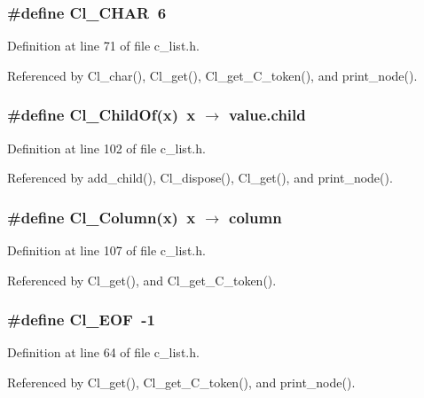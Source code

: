 \subsubsection{\setlength{\rightskip}{0pt plus 5cm}\#define Cl\_\-CHAR~6}\label{c__list_8h_038fd19f2434e08b103262df0fdebcd2}




Definition at line 71 of file c\_\-list.h.

Referenced by Cl\_\-char(), Cl\_\-get(), Cl\_\-get\_\-C\_\-token(), and print\_\-node().
\subsubsection{\setlength{\rightskip}{0pt plus 5cm}\#define Cl\_\-Child\-Of(x)~x $\rightarrow$ value.child}\label{c__list_8h_b9cbe7277c1f9ffaceaafea877fc41de}




Definition at line 102 of file c\_\-list.h.

Referenced by add\_\-child(), Cl\_\-dispose(), Cl\_\-get(), and print\_\-node().
\subsubsection{\setlength{\rightskip}{0pt plus 5cm}\#define Cl\_\-Column(x)~x $\rightarrow$ column}\label{c__list_8h_11d2d38eb19032f0c095052d1ea1aef9}




Definition at line 107 of file c\_\-list.h.

Referenced by Cl\_\-get(), and Cl\_\-get\_\-C\_\-token().
\subsubsection{\setlength{\rightskip}{0pt plus 5cm}\#define Cl\_\-EOF~-1}\label{c__list_8h_b3467c2bb2989fe526dbe04fa339f2df}




Definition at line 64 of file c\_\-list.h.

Referenced by Cl\_\-get(), Cl\_\-get\_\-C\_\-token(), and print\_\-node().
